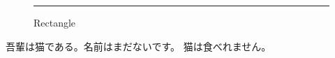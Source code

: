 \documentclass[uplatex,dvipdfmx]{jlreq}
\begin{document}
\lipsum[1-2]
  \begin{figure}[h]
    \centering
    \rule{8cm}{6cm}
    \caption{Rectangle}
  \end{figure}
吾輩は猫である。名前はまだないです。
猫は食べれません。
\end{document}
